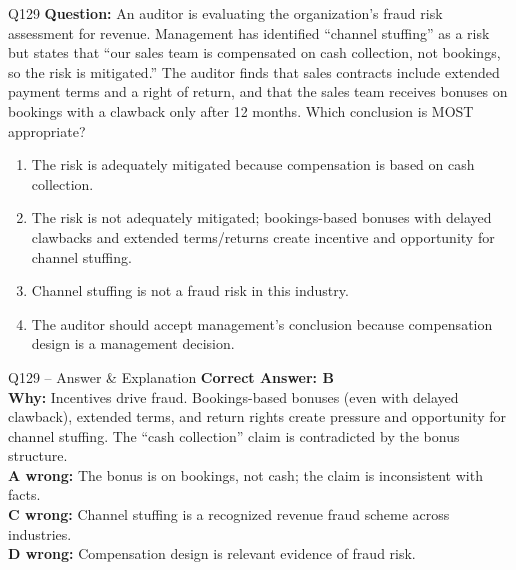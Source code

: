 \documentclass[aspectratio=169,10pt]{beamer}
\begin{document}
	\begin{frame}[t]{Q129}
		\small
		\textbf{Question:} An auditor is evaluating the organization's fraud risk assessment for revenue. Management has identified ``channel stuffing'' as a risk but states that ``our sales team is compensated on cash collection, not bookings, so the risk is mitigated.'' The auditor finds that sales contracts include extended payment terms and a right of return, and that the sales team receives bonuses on bookings with a clawback only after 12 months. Which conclusion is MOST appropriate?
		\begin{enumerate}[label=\Alph*.,itemsep=1pt,topsep=2pt]
			\item The risk is adequately mitigated because compensation is based on cash collection.
			\item The risk is not adequately mitigated; bookings-based bonuses with delayed clawbacks and extended terms/returns create incentive and opportunity for channel stuffing.
			\item Channel stuffing is not a fraud risk in this industry.
			\item The auditor should accept management's conclusion because compensation design is a management decision.
		\end{enumerate}
	\end{frame}
	
	\begin{frame}[t]{Q129 -- Answer \& Explanation}
		\small
		\textbf{Correct Answer: B} \\[4pt]
		\textbf{Why:} Incentives drive fraud. Bookings-based bonuses (even with delayed clawback), extended terms, and return rights create pressure and opportunity for channel stuffing. The ``cash collection'' claim is contradicted by the bonus structure. \\[4pt]
		\textbf{A wrong:} The bonus is on bookings, not cash; the claim is inconsistent with facts. \\[2pt]
		\textbf{C wrong:} Channel stuffing is a recognized revenue fraud scheme across industries. \\[2pt]
		\textbf{D wrong:} Compensation design is relevant evidence of fraud risk.
	\end{frame}
	
\end{document}
